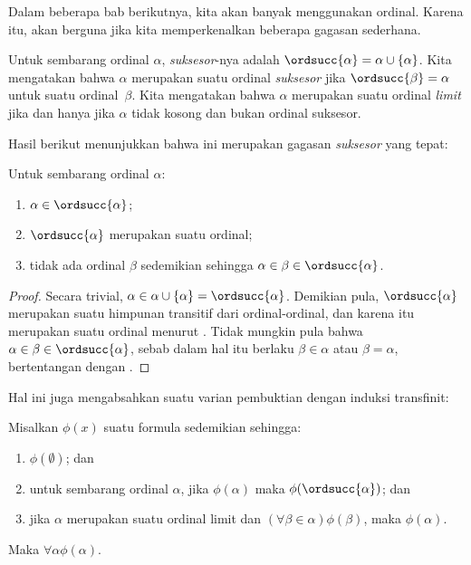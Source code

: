 \documentclass[../../../include/open-logic-section]{subfiles}
\begin{document}

Dalam beberapa bab berikutnya, kita akan banyak menggunakan ordinal. Karena
itu, akan berguna jika kita memperkenalkan beberapa gagasan sederhana.

\begin{defn}
Untuk sembarang ordinal $\alpha$, \emph{suksesor}-nya adalah
$\ordsucc{\alpha} =\alpha \cup \{\alpha\}$. Kita mengatakan bahwa $\alpha$
merupakan suatu ordinal \emph{suksesor} jika $\ordsucc{\beta} = \alpha$
untuk suatu ordinal~$\beta$. Kita mengatakan bahwa $\alpha$ merupakan suatu
ordinal \emph{limit} jika dan hanya jika $\alpha$ tidak kosong dan bukan
ordinal suksesor.
\end{defn}
\noindent
Hasil berikut menunjukkan bahwa ini merupakan gagasan \emph{suksesor} yang
tepat:

\begin{prop}
Untuk sembarang ordinal $\alpha$:
\begin{enumerate}
	\item $\alpha \in \ordsucc{\alpha}$;
	\item $\ordsucc{\alpha}$ merupakan suatu ordinal;
	\item tidak ada ordinal $\beta$ sedemikian sehingga $\alpha \in \beta
	\in \ordsucc{\alpha}$.
	\end{enumerate}
\end{prop}

\begin{proof}
Secara trivial, $\alpha \in \alpha \cup \{\alpha\} =
\ordsucc{\alpha}$. Demikian pula, $\ordsucc{\alpha}$ merupakan suatu
himpunan transitif dari ordinal-ordinal, dan karena itu merupakan suatu
ordinal menurut . Tidak mungkin pula bahwa
$\alpha \in \beta \in \ordsucc{\alpha}$, sebab dalam hal itu berlaku
$\beta \in \alpha$ atau $\beta = \alpha$, bertentangan dengan
.
\end{proof}
\noindent
Hal ini juga mengabsahkan suatu varian pembuktian dengan induksi transfinit:

\begin{thm}
Misalkan $\phi(x)$ suatu formula sedemikian sehingga:
\begin{enumerate}
	\item $\phi(\emptyset)$; dan
	\item untuk sembarang ordinal $\alpha$, jika $\phi(\alpha)$ maka
	$\phi(\ordsucc{\alpha})$; dan
	\item jika $\alpha$ merupakan suatu ordinal limit dan $(\forall \beta \in
	\alpha)\phi(\beta)$, maka $\phi(\alpha)$.
\end{enumerate}
Maka $\forall \alpha \phi(\alpha)$.
\end{thm}
\end{document}
